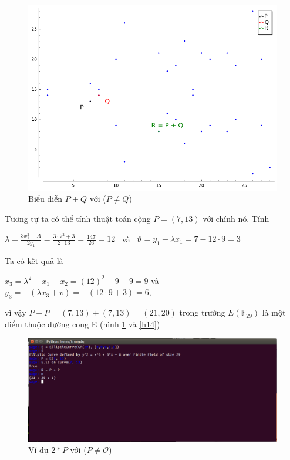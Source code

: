 \documentclass[a4paper,12pt]{report}
\begin{document}
\begin{center}
\begin{figure}[H]
\includegraphics[width=0.8\linewidth]{../im13.png}
\caption{Biểu diễn $P + Q$ với ($P \neq Q$)}
\end{figure}
\end{center}
Tương tự ta có thể tính thuật toán cộng $P = (7, 13)$ với chính nó. Tính
\begin{center}
$\displaystyle \lambda = \frac{3x_1^2 + A}{2y_1} = \frac{3\cdot7^2 + 3}{2\cdot13} = \frac{147}{26} = 12$ \ và \ $\vartheta = y_1 - \lambda x_1 = 7 - 12\cdot9 = 3$
\end{center}
Ta có kết quả là 
\begin{center}
$x_3 = \lambda^2 - x_1 - x_2 = (12)^2 - 9 - 9 = 9$ và $y_3 = -(\lambda x_3 + v) = -(12\cdot9 + 3) = 6$,
\end{center}
vì vậy $P + P = (7, 13) + (7, 13) = (21,20)$ trong trường $E(\mathbb{F}_{29})$ là một điểm thuộc đường cong E (hình \ref{h18} và \ref{h14})
\begin{center}
\begin{figure}[H]
\includegraphics[width=0.9\linewidth]{../im18.png}
\caption{Ví dụ $2*P$ với ($P \neq \mathcal{O}$)} \label{h18}
\end{figure}
\end{center}
\end{document}

